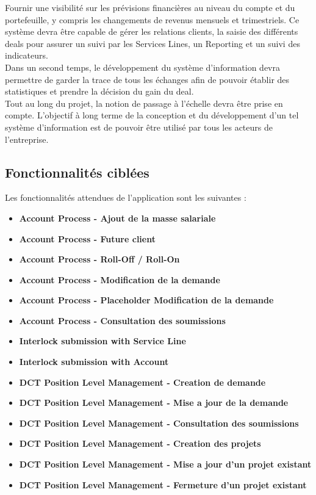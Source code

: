 Fournir une visibilité sur les prévisions financières au niveau du compte et du portefeuille, y compris les changements de revenus mensuels et trimestriels. Ce système devra être capable de gérer les relations clients, la saisie des différents deals pour assurer un suivi par les Services Lines, un Reporting et un suivi des indicateurs.
\\

Dans un second temps, le développement du système d’information devra permettre de garder la trace de tous les échanges afin de pouvoir établir des statistiques et prendre la décision du gain du deal.
\\

Tout au long du projet, la notion de passage à l’échelle devra être prise en compte. L’objectif à long terme de la conception et du développement d’un tel système d’information est de pouvoir être utilisé par tous les acteurs de l’entreprise.

\subsection{Fonctionnalités ciblées}

Les fonctionnalités attendues de l'application sont les suivantes :
\\

\begin{itemize}
    \item \textbf{Account Process - Ajout de la masse salariale}
    \item \textbf{Account Process - Future client}
    \item \textbf{Account Process - Roll-Off / Roll-On}
    \item \textbf{Account Process - Modification de la demande}
    \item \textbf{Account Process - Placeholder Modification de la demande}
    \item \textbf{Account Process - Consultation des soumissions}
    \item \textbf{Interlock submission with Service Line}
    \item \textbf{Interlock submission with Account}
    \item \textbf{DCT Position Level Management - Creation de demande}
    \item \textbf{DCT Position Level Management - Mise a jour de la demande}
    \item \textbf{DCT Position Level Management - Consultation des soumissions}
    \item \textbf{DCT Position Level Management - Creation des projets}
    \item \textbf{DCT Position Level Management - Mise a jour d'un projet existant}
    \item \textbf{DCT Position Level Management - Fermeture d'un projet existant}
\end{itemize}


